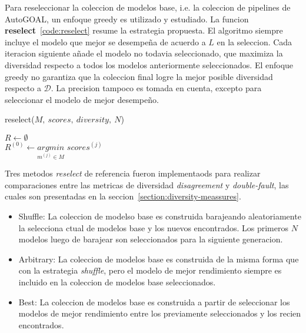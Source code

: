 Para reseleccionar la coleccion de modelos base, i.e. la coleccion de pipelines de AutoGOAL, un enfoque greedy es utilizado y estudiado. La funcion \textbf{reselect}~\ref{code:reselect} resume la estrategia propuesta. El algoritmo siempre incluye el modelo que mejor se desempeña de acuerdo a $L$ en la seleccion. Cada iteracion siguiente añade el modelo no todavia seleccionado, que maximiza la diversidad respecto a todos los modelos anteriormente seleccionados. El enfoque greedy no garantiza que la coleccion final logre la mejor posible diversidad respecto a $\mathcal{D}$. La precision tampoco es tomada en cuenta, excepto para seleccionar el modelo de mejor desempeño.

\begin{function}[htb!]
    \caption{reselect($M,\ scores,\ diversity,\ N$)\label{code:reselect}}

    \init $R \leftarrow \emptyset$ \\
    \init $R^{(0)} \leftarrow \underset{m^{(j)} \in M}{argmin}$ $scores^{(j)}$ \\

\end{function}

Tres metodos \textit{reselect} de referencia fueron implementaods para realizar comparaciones entre las metricas de diversidad \textit{disagreement} y \textit{double-fault}, las cuales son presentadas en la seccion~\ref{section:diversity-meassures}.
\begin{itemize}
    \item Shuffle: La coleccion de modelso base es construida barajeando aleatoriamente la selecciona ctual de modelos base y los nuevos encontrados. Los primeros $N$ modelos luego de barajear son seleccionados para la siguiente generacion.
    \item Arbitrary: La coleccion de modelos base es construida de la misma forma que con la estrategia \textit{shuffle}, pero el modelo de mejor rendimiento siempre es incluido en la coleccion de modelos base seleccionados.
    \item Best: La coleccion de modelos base es construida a partir de seleccionar los modelos de mejor rendimiento entre los previamente seleccionados y los recien encontrados.
\end{itemize}

